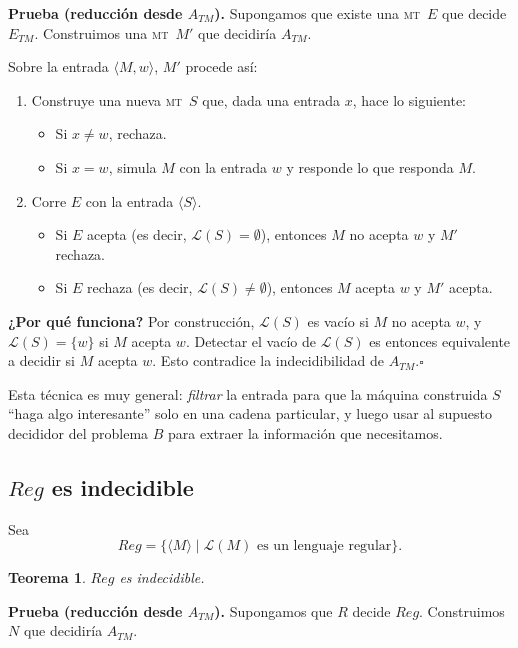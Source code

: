 \documentclass[11pt,a4paper]{article}
\theoremstyle{definicion}
\newtheorem{teorema}[definicion]{Teorema}
\newcommand{\MT}{\textsc{mt}}
\newcommand{\enc}[1]{\langle #1 \rangle}
\newcommand{\Lang}{\mathcal{L}}
\begin{document}
\textbf{Prueba (reducción desde $A_{TM}$).} Supongamos que existe una \MT\ $E$ que decide $E_{TM}$. Construimos una \MT\ $M'$ que decidiría $A_{TM}$.

Sobre la entrada $\enc{M, w}$, $M'$ procede así:
\begin{enumerate}
    \item Construye una nueva \MT\ $S$ que, dada una entrada $x$, hace lo siguiente:
    \begin{itemize}
        \item Si $x \neq w$, rechaza.
        \item Si $x = w$, simula $M$ con la entrada $w$ y responde lo que responda $M$.
    \end{itemize}
    \item Corre $E$ con la entrada $\enc{S}$.
    \begin{itemize}
        \item Si $E$ acepta (es decir, $\Lang(S) = \emptyset$), entonces $M$ no acepta $w$ y $M'$ rechaza.
        \item Si $E$ rechaza (es decir, $\Lang(S) \neq \emptyset$), entonces $M$ acepta $w$ y $M'$ acepta.
    \end{itemize}
\end{enumerate}

\textbf{¿Por qué funciona?} Por construcción, $\Lang(S)$ es vacío si $M$ no acepta $w$, y $\Lang(S) = \{w\}$ si $M$ acepta $w$. Detectar el vacío de $\Lang(S)$ es entonces equivalente a decidir si $M$ acepta $w$. Esto contradice la indecidibilidad de $A_{TM}$.\hfill$\square$

\begin{idea}
Esta técnica es muy general: \emph{filtrar} la entrada para que la máquina construida $S$ ``haga algo interesante'' solo en una cadena particular, y luego usar al supuesto decididor del problema $B$ para extraer la información que necesitamos.
\end{idea}

\subsection{$Reg$ es indecidible}

Sea
\[
Reg = \{ \enc{M} \mid \Lang(M) \text{ es un lenguaje regular} \}.
\]

\begin{teorema}
$Reg$ es indecidible.
\end{teorema}

\textbf{Prueba (reducción desde $A_{TM}$).} Supongamos que $R$ decide $Reg$. Construimos $N$ que decidiría $A_{TM}$.
\end{document}
